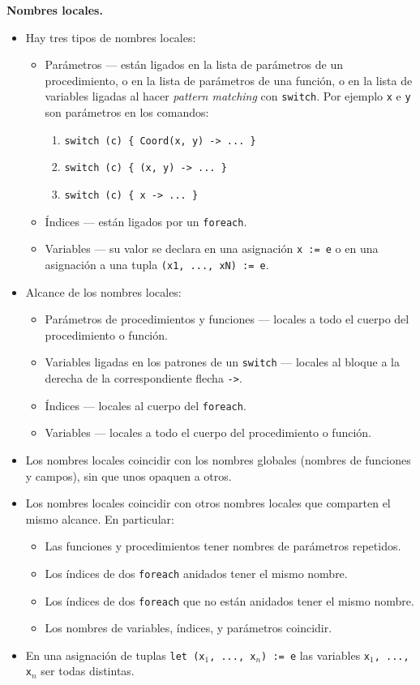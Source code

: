 \documentclass{article}
\begin{document}
{\bf Nombres locales.}
\begin{itemize}
\item Hay tres tipos de nombres locales:
  \begin{itemize}
  \item Par\'ametros --- est\'an ligados en la lista de par\'ametros de
        un procedimiento, o en la lista de par\'ametros de una funci\'on, 
        o en la lista de variables ligadas al hacer {\em pattern matching}
        con \texttt{switch}. Por ejemplo \texttt{x} e \texttt{y} son par\'ametros
        en los comandos:
        \begin{enumerate}
        \item \texttt{switch (c) \{ Coord(x, y) ->\ ... \}}
        \item \texttt{switch (c) \{ (x, y) ->\ ... \}}
        \item \texttt{switch (c) \{ x ->\ ... \}}
        \end{enumerate}
  \item \'Indices --- est\'an ligados por un \texttt{foreach}.
  \item Variables --- su valor se declara en una asignaci\'on \texttt{x := e} o en una asignaci\'on
        a una tupla \texttt{(x1, ..., xN) := e}.
  \end{itemize}
\item Alcance de los nombres locales:
  \begin{itemize}
  \item Par\'ametros de procedimientos y funciones --- locales a todo el cuerpo del procedimiento o funci\'on.
  \item Variables ligadas en los patrones de un \texttt{switch} --- locales al bloque a la derecha de la correspondiente flecha \texttt{->}.
  \item \'Indices --- locales al cuerpo del \texttt{foreach}.
  \item Variables --- locales a todo el cuerpo del procedimiento o funci\'on.
  \end{itemize}
\item Los nombres locales \PUEDEN
      coincidir con los nombres globales (nombres de funciones y campos), sin
      que unos opaquen a otros.
\item Los nombres locales \NOPUEDEN coincidir con otros nombres locales que comparten el mismo alcance.
      En particular:
  \begin{itemize}
  \item Las funciones y procedimientos \NOPUEDEN tener nombres de par\'ametros repetidos.
  \item Los \'indices de dos \texttt{foreach} anidados \NOPUEDEN tener el mismo nombre.
  \item Los \'indices de dos \texttt{foreach} que no est\'an anidados \PUEDEN tener el mismo nombre.
  \item Los nombres de variables, \'indices, y par\'ametros \NOPUEDEN coincidir.
  \end{itemize}
\item En una asignaci\'on de tuplas \texttt{let (x$_1$, ..., x$_n$) := e}
      las variables \texttt{x$_1$, ..., x$_n$} \DEBEN ser todas distintas. 
\end{itemize}
\end{document}
